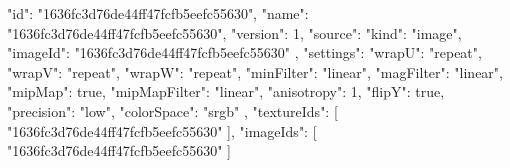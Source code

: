 {
  "id": "1636fc3d76de44ff47fcfb5eefc55630",
  "name": "1636fc3d76de44ff47fcfb5eefc55630",
  "version": 1,
  "source": {
    "kind": "image",
    "imageId": "1636fc3d76de44ff47fcfb5eefc55630"
  },
  "settings": {
    "wrapU": "repeat",
    "wrapV": "repeat",
    "wrapW": "repeat",
    "minFilter": "linear",
    "magFilter": "linear",
    "mipMap": true,
    "mipMapFilter": "linear",
    "anisotropy": 1,
    "flipY": true,
    "precision": "low",
    "colorSpace": "srgb"
  },
  "textureIds": [
    "1636fc3d76de44ff47fcfb5eefc55630"
  ],
  "imageIds": [
    "1636fc3d76de44ff47fcfb5eefc55630"
  ]
}
